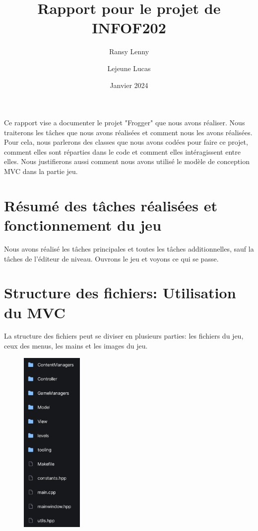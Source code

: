 \documentclass[a4paper, 12pt]{article}
\title{\textbf{Rapport pour le projet de INFOF202}}
\author{
    Ransy Lenny
    \and
    Lejeune Lucas
    }
\date{Janvier 2024}
\begin{document}
\setlength{\parindent}{0em}

\maketitle

Ce rapport vise a documenter le projet "Frogger" que nous avons réaliser. Nous traiterons les tâches que nous avons réalisées et comment nous les avons réalisées. Pour cela, nous parlerons des classes que nous avons codées pour faire ce projet, comment elles sont réparties dans le code et comment elles intéragissent entre elles. Nous justifierons aussi comment nous avons utilisé le modèle de conception MVC dans la partie jeu.

\tableofcontents

\pagebreak

\section{Résumé des tâches réalisées et fonctionnement du jeu}
Nous avons réalisé les tâches principales et toutes les tâches additionnelles, sauf la tâches de l'éditeur de niveau. 
Ouvrons le jeu et voyons ce qui se passe. 

\section{Structure des fichiers: Utilisation du MVC}

La structure des fichiers peut se diviser en plusieurs parties: les fichiers du jeu, ceux des menus, les mains et les images du jeu. \\

\begin{figure}
\includegraphics[width=3cm]{Images/folders.jpg}
\end{figure}
\end{document}
